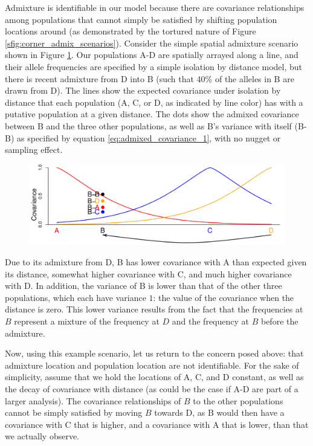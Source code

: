 \documentclass[12pt]{article}
\begin{document}
Admixture is identifiable in our model because there are covariance relationships among populations that cannot simply be satisfied by shifting population locations around (as demonstrated by the tortured nature of Figure \ref{sfig:corner_admix_scenarios}). Consider the simple spatial admixture scenario shown in Figure \ref{sfig:toy_admixture}. Our populations A-D are spatially arrayed  along a line, and their allele frequencies are specified by a simple isolation by distance model, but there is recent admixture from D into B (such that 40\% of the alleles in B are drawn from D).  The lines show the expected covariance under isolation by distance that each population (A, C, or D, as indicated by line color) has with a putative population at a given distance.  The dots show the admixed covariance between B and the three other populations, as well as B's variance with itself (B-B) as specified by equation \eqref{eq:admixed_covariance_1}, with no nugget or sampling effect.

\begin{figure}[htp!]
	\centering
	\includegraphics[width=\textwidth]{figs/sims/Admix_covar_toy_fig.pdf}
	\caption{} \label{sfig:toy_admixture}
\end{figure}

Due to its admixture from D, B has lower covariance with A than expected given its distance, somewhat higher covariance with C, and much higher covariance with D. In addition, the variance of B is lower than that of the other three populations, which each have variance $1$: the value of the covariance when the distance is zero. This lower variance results from the fact that the frequencies at $B$ represent a mixture of the frequency at $D$ and the frequency at $B$ before the admixture. 

Now, using this example scenario, let us return to the concern posed above: that admixture location and population location are not identifiable.  For the sake of simplicity, assume that we hold the locations of A, C, and D constant, as well as the decay of covariance with distance (as could be the case if A-D are part of a larger analysis).  The covariance relationships of $B$ to the other populations cannot be simply satisfied by moving $B$ towards D, as B would then have a covariance with C that is higher, and a covariance with A that is lower, than that we actually observe. 
\end{document}
